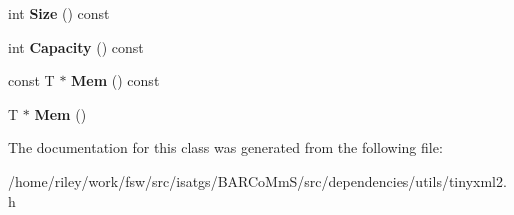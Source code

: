 \begin{DoxyCompactItemize}
\item 
int {\bfseries Size} () const \hypertarget{classtinyxml2_1_1_dyn_array_a1299b257b62ea6b4983c488867f219b0}{}\label{classtinyxml2_1_1_dyn_array_a1299b257b62ea6b4983c488867f219b0}

\item 
int {\bfseries Capacity} () const \hypertarget{classtinyxml2_1_1_dyn_array_a8edbe90ed53b2e46b1b5cf53b261e4e7}{}\label{classtinyxml2_1_1_dyn_array_a8edbe90ed53b2e46b1b5cf53b261e4e7}

\item 
const T $\ast$ {\bfseries Mem} () const \hypertarget{classtinyxml2_1_1_dyn_array_a1f39330daeb97d3d1dc3fc12dcf7ac67}{}\label{classtinyxml2_1_1_dyn_array_a1f39330daeb97d3d1dc3fc12dcf7ac67}

\item 
T $\ast$ {\bfseries Mem} ()\hypertarget{classtinyxml2_1_1_dyn_array_a0e0d60b399d54fad5b33d5008bc59c8e}{}\label{classtinyxml2_1_1_dyn_array_a0e0d60b399d54fad5b33d5008bc59c8e}

\end{DoxyCompactItemize}


The documentation for this class was generated from the following file\+:\begin{DoxyCompactItemize}
\item 
/home/riley/work/fsw/src/isatgs/\+B\+A\+R\+Co\+Mm\+S/src/dependencies/utils/tinyxml2.\+h\end{DoxyCompactItemize}
